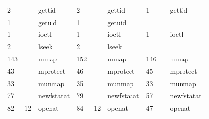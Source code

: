 \documentclass[submit,techreq,noauthor]{eco}	%
\begin{document}
\begin{table}[t]
\begin{tabular}{|lllllllll|}
  \multicolumn{1}{|l|}{2}     & \multicolumn{1}{l|}{}       & \multicolumn{1}{l|}{gettid}            & \multicolumn{1}{l|}{2}     & \multicolumn{1}{l|}{}       & \multicolumn{1}{l|}{gettid}            & \multicolumn{1}{l|}{1}     & \multicolumn{1}{l|}{}       & gettid            \\
  \multicolumn{1}{|l|}{1}     & \multicolumn{1}{l|}{}       & \multicolumn{1}{l|}{getuid}            & \multicolumn{1}{l|}{1}     & \multicolumn{1}{l|}{}       & \multicolumn{1}{l|}{getuid}            & \multicolumn{1}{l|}{}      & \multicolumn{1}{l|}{}       &                   \\
  \multicolumn{1}{|l|}{1}     & \multicolumn{1}{l|}{}       & \multicolumn{1}{l|}{ioctl}             & \multicolumn{1}{l|}{1}     & \multicolumn{1}{l|}{}       & \multicolumn{1}{l|}{ioctl}             & \multicolumn{1}{l|}{1}     & \multicolumn{1}{l|}{}       & ioctl             \\
  \multicolumn{1}{|l|}{2}     & \multicolumn{1}{l|}{}       & \multicolumn{1}{l|}{lseek}             & \multicolumn{1}{l|}{2}     & \multicolumn{1}{l|}{}       & \multicolumn{1}{l|}{lseek}             & \multicolumn{1}{l|}{}      & \multicolumn{1}{l|}{}       &                   \\
  \multicolumn{1}{|l|}{143}   & \multicolumn{1}{l|}{}       & \multicolumn{1}{l|}{mmap}              & \multicolumn{1}{l|}{152}   & \multicolumn{1}{l|}{}       & \multicolumn{1}{l|}{mmap}              & \multicolumn{1}{l|}{146}   & \multicolumn{1}{l|}{}       & mmap              \\
  \multicolumn{1}{|l|}{43}    & \multicolumn{1}{l|}{}       & \multicolumn{1}{l|}{mprotect}          & \multicolumn{1}{l|}{46}    & \multicolumn{1}{l|}{}       & \multicolumn{1}{l|}{mprotect}          & \multicolumn{1}{l|}{45}    & \multicolumn{1}{l|}{}       & mprotect          \\
  \multicolumn{1}{|l|}{33}    & \multicolumn{1}{l|}{}       & \multicolumn{1}{l|}{munmap}            & \multicolumn{1}{l|}{35}    & \multicolumn{1}{l|}{}       & \multicolumn{1}{l|}{munmap}            & \multicolumn{1}{l|}{33}    & \multicolumn{1}{l|}{}       & munmap            \\
  \multicolumn{1}{|l|}{77}    & \multicolumn{1}{l|}{}       & \multicolumn{1}{l|}{newfstatat}        & \multicolumn{1}{l|}{79}    & \multicolumn{1}{l|}{}       & \multicolumn{1}{l|}{newfstatat}        & \multicolumn{1}{l|}{57}    & \multicolumn{1}{l|}{}       & newfstatat        \\
  \multicolumn{1}{|l|}{82}    & \multicolumn{1}{l|}{12}     & \multicolumn{1}{l|}{openat}            & \multicolumn{1}{l|}{84}    & \multicolumn{1}{l|}{12}     & \multicolumn{1}{l|}{openat}            & \multicolumn{1}{l|}{47}    & \multicolumn{1}{l|}{}       & openat            \\

\end{tabular}
\end{table}
\end{document}
